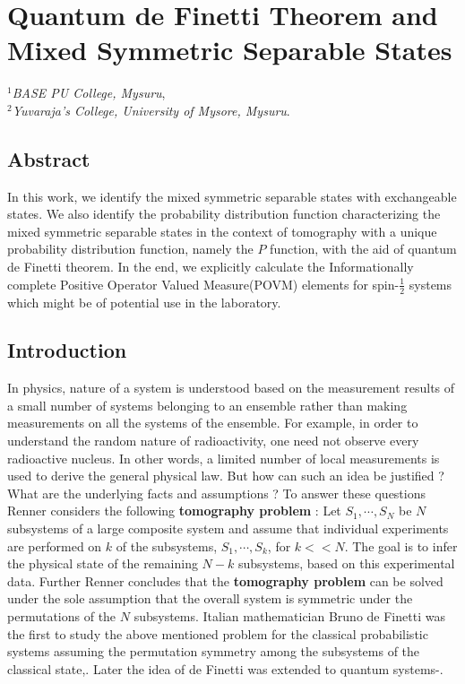 \chapter[Quantum de Finetti Theorem and Mixed Symmetric Separable States]{Quantum de Finetti Theorem and Mixed Symmetric Separable States}\label{chap16}


\begin{center}
$^1$\textit{BASE PU College, Mysuru},\\
$^2$\textit{Yuvaraja's College, University of Mysore, Mysuru}.
\end{center}


\section*{Abstract}

In this work, we identify the mixed symmetric separable states with exchangeable states. We also identify the probability distribution function characterizing the mixed symmetric separable states in the context of tomography with a unique probability distribution function, namely the $P$ function, with the aid of quantum de Finetti theorem. In the end, we explicitly calculate the Informationally complete Positive Operator Valued Measure(POVM) elements for spin-$\frac{1}{2}$ systems which might be of potential use in the laboratory.

\section{Introduction}\label{chap16-sec1}

In physics, nature of a system is understood based on the measurement results of a small number of systems belonging to an ensemble rather than making measurements on all the systems of the ensemble. For example, in order to understand the random nature of radioactivity, one need not observe every radioactive nucleus. In other words, a limited number of local measurements is used to derive the general physical law. But how can such an idea be justified ? What are the underlying facts and assumptions ? To answer these questions Renner\cite{chap16-key1} considers the following \textbf{tomography problem} : Let $S_{1},\cdots,S_{N}$ be $N$ subsystems of a large composite system and assume that individual experiments are performed on $k$ of the subsystems, $S_{1},\cdots,S_{k}$, for $k<<N$. The goal is to infer the physical state of the remaining $N-k$ subsystems, based on this experimental data. Further Renner\cite{chap16-key1} concludes that the \textbf{tomography problem} can be solved under the sole assumption that the overall system is symmetric under the permutations of the $N$ subsystems. Italian mathematician Bruno de Finetti was the first to study the above mentioned problem for the classical probabilistic systems assuming the permutation symmetry among the subsystems of the classical state\cite{chap16-key2},\cite{chap16-key3}. Later the idea of de Finetti was extended to quantum systems\cite{chap16-key4}-\cite{chap16-key7}.

